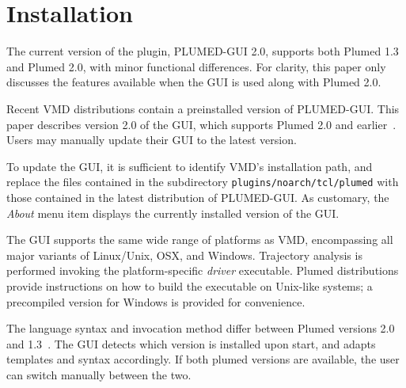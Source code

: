 \documentclass[preprint,12pt]{elsarticle}
\begin{document}
\section{Installation}


The current version of the plugin, PLUMED-GUI 2.0, supports both
Plumed 1.3 and Plumed 2.0, with minor functional differences. For
clarity, this paper only discusses the features available when the GUI
is used along with Plumed 2.0.

Recent VMD distributions contain a preinstalled version of PLUMED-GUI.
This paper describes version 2.0 of the GUI, which supports Plumed 2.0
and earlier~\cite{bonomi_plumed:_2009}.  Users may manually update
their GUI to the latest version.

To update the GUI, it is sufficient to identify VMD's installation
path, and replace the files contained in the subdirectory
\texttt{plugins/noarch/tcl/plumed} with those contained in the latest
distribution of PLUMED-GUI.  As customary, the \emph{About} menu item
displays the currently installed version of the GUI.







The GUI supports the same wide range of platforms as VMD, encompassing
all major variants of Linux/Unix, OSX, and Windows.  Trajectory
analysis is performed invoking the platform-specific \emph{driver}
executable. Plumed distributions provide instructions on how to build
the executable on Unix-like systems; a precompiled version for Windows
is provided for convenience.




The language syntax and invocation method differ between Plumed
versions 2.0 and 1.3~\cite{bonomi_plumed:_2009}.  The GUI detects
which version is installed upon start, and adapts templates and syntax
accordingly.  If both plumed versions are available, the user can
switch manually between the two.
\end{document}
